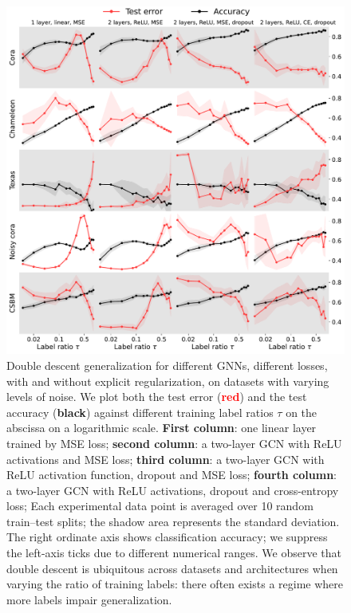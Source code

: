 \documentclass[9pt,twocolumn]{pnas-new}
\newcommand{\idd}[1]{{#1}}
\begin{document}
\begin{figure}[t]
        \centering 
        \includegraphics[width=\linewidth]{figs_real_log.pdf}
        \caption{\idd{Double descent generalization for different GNNs, different losses, with and without explicit regularization, on datasets with varying levels of noise. We plot both the test error (\textcolor{red}{\textbf{red}}) and the test accuracy (\textbf{black}) against different training label ratios $\tau$ on the abscissa on a logarithmic scale. \textbf{First column}: one linear layer  trained by MSE loss; \textbf{second column}: a two-layer GCN with ReLU activations and MSE loss; \textbf{third column}: a two-layer GCN with ReLU activation function, dropout and MSE loss; \textbf{fourth column}: a two-layer GCN  with ReLU activations, dropout and cross-entropy loss;  Each experimental data point is averaged over 10 random train--test splits; the shadow area represents the standard deviation.
        The right ordinate axis shows classification accuracy; we suppress the left-axis ticks due to different numerical ranges.
        We observe that double descent is ubiquitous across datasets and architectures when varying the ratio of training labels: there often exists a regime where more labels impair generalization. }
        }
        \label{fig: Real DD}
\end{figure}
\end{document}
